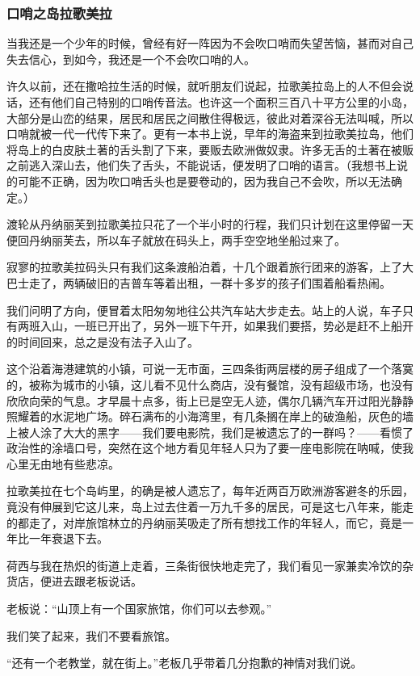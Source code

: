 \subsubsection*{口哨之岛拉歌美拉}
\par 当我还是一个少年的时候，曾经有好一阵因为不会吹口哨而失望苦恼，甚而对自己失去信心，到如今，我还是一个不会吹口哨的人。
\par 许久以前，还在撒哈拉生活的时候，就听朋友们说起，拉歌美拉岛上的人不但会说话，还有他们自己特别的口哨传音法。也许这一个面积三百八十平方公里的小岛，大部分是山峦的结果，居民和居民之间散住得极远，彼此对着深谷无法叫喊，所以口哨就被一代一代传下来了。更有一本书上说，早年的海盗来到拉歌美拉岛，他们将岛上的白皮肤土著的舌头割了下来，要贩去欧洲做奴隶。许多无舌的土著在被贩之前逃入深山去，他们失了舌头，不能说话，便发明了口哨的语言。（我想书上说的可能不正确，因为吹口哨舌头也是要卷动的，因为我自己不会吹，所以无法确定。）
\par 渡轮从丹纳丽芙到拉歌美拉只花了一个半小时的行程，我们只计划在这里停留一天便回丹纳丽芙去，所以车子就放在码头上，两手空空地坐船过来了。
\par 寂寥的拉歌美拉码头只有我们这条渡船泊着，十几个跟着旅行团来的游客，上了大巴士走了，两辆破旧的吉普车等着出租，一群十多岁的孩子们围着船看热闹。
\par 我们问明了方向，便冒着太阳匆匆地往公共汽车站大步走去。站上的人说，车子只有两班入山，一班已开出了，另外一班下午开，如果我们要搭，势必是赶不上船开的时间回来，总之是没有法子入山了。
\par 这个沿着海港建筑的小镇，可说一无市面，三四条街两层楼的房子组成了一个落寞的，被称为城市的小镇，这儿看不见什么商店，没有餐馆，没有超级市场，也没有欣欣向荣的气息。才早晨十点多，街上已是空无人迹，偶尔几辆汽车开过阳光静静照耀着的水泥地广场。碎石满布的小海湾里，有几条搁在岸上的破渔船，灰色的墙上被人涂了大大的黑字——我们要电影院，我们是被遗忘了的一群吗？——看惯了政治性的涂墙口号，突然在这个地方看见年轻人只为了要一座电影院在呐喊，使我心里无由地有些悲凉。
\par 拉歌美拉在七个岛屿里，的确是被人遗忘了，每年近两百万欧洲游客避冬的乐园，竟没有伸展到它这儿来，岛上过去住着一万九千多的居民，可是这七八年来，能走的都走了，对岸旅馆林立的丹纳丽芙吸走了所有想找工作的年轻人，而它，竟是一年比一年衰退下去。
\par 荷西与我在热炽的街道上走着，三条街很快地走完了，我们看见一家兼卖冷饮的杂货店，便进去跟老板说话。
\par 老板说：“山顶上有一个国家旅馆，你们可以去参观。”
\par 我们笑了起来，我们不要看旅馆。
\par “还有一个老教堂，就在街上。”老板几乎带着几分抱歉的神情对我们说。

